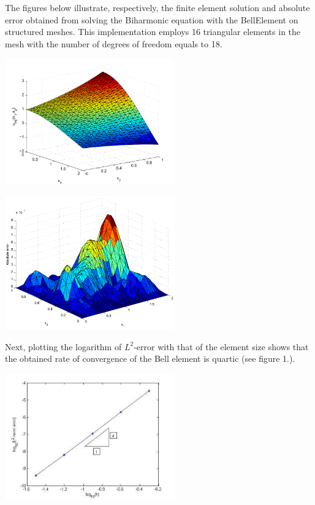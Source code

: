 The figures below illustrate, respectively, the finite element solution and absolute error obtained from solving the Biharmonic equation with the {\ttfamily Bell\+Element} on structured meshes. This implementation employs 16 triangular elements in the mesh with the number of degrees of freedom equals to 18.

 
\begin{DoxyImage}
\includegraphics[width=0.55\textwidth]{Biharmonic_Bell_Soln}
\end{DoxyImage}


 
\begin{DoxyImage}
\includegraphics[width=0.55\textwidth]{Biharmonic_Bell_Err}
\end{DoxyImage}


Next, plotting the logarithm of $ L^2 $-\/error with that of the element size shows that the obtained rate of convergence of the Bell element is quartic (see figure 1.).

 
\begin{DoxyImage}
\includegraphics[width=0.55\textwidth]{Bell_Err_log}
\end{DoxyImage}




